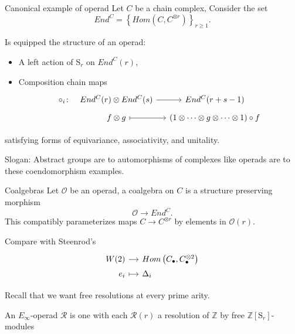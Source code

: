 \documentclass[10pt,t]{beamer}
\renewcommand{\S}{\mathrm{S}}
\begin{document}
\begin{frame}[fragile]{Canonical example of operad}
	Let $C$ be a chain complex, Consider the set
	\begin{equation*}
	End^C = \left\{Hom(C, C^{\otimes r})\right\}_{r \geq 1}.
	\end{equation*}
	
	\pause
	
	Is equipped the structure of an operad:
	\begin{itemize}
		\item A left action of $\S_r$ on $End^C(r)$,
		\item Composition chain maps
		\begin{equation*}
		\begin{tikzcd}[column sep=small, row sep=tiny]
		\circ_i \colon &[-10pt] End^C(r) \otimes End^C(s) \arrow[r] & End^C(r+s-1) \\
		& f \otimes g \arrow[r, |->] & (1 \otimes \cdots \otimes g \otimes \cdots \otimes 1) \circ f 
		\end{tikzcd}
		\end{equation*}
	\end{itemize}
	satisfying forms of equivariance, associativity, and unitality.
	
	\pause \vspace*{10pt}
	
	\textcolor{pblue}{Slogan:} Abstract groups are to automorphisms of complexes like operads are to these coendomorphism examples.
\end{frame}


\begin{frame}[fragile]{Coalgebras}
	Let $\mathcal O$ be an operad, a coalgebra on $C$ is a structure preserving morphism
	\begin{equation*}
	\mathcal O \to End^C.
	\end{equation*}
	This compatibly parameterizes maps $C \to C^{\otimes r}$ by elements in $\mathcal O(r)$.
	
	\pause \vspace*{10pt}
	
	Compare with Steenrod's
	\vspace*{-2pt}
	\begin{equation*}
	\begin{tikzcd}[%
	row sep=tiny,
	column sep = small,
	,row sep = 0ex
	,/tikz/column 1/.append style={anchor=base east}
	,/tikz/column 2/.append style={anchor=base west}
	]
	W(2) \arrow[r] & Hom\left(C_\bullet, C_\bullet^{\otimes 2}\right) \\
	e_i \arrow[r, |->] & \Delta_i
	\end{tikzcd}
	\end{equation*}
	
	\pause
	Recall that we want free resolutions at every prime arity.

	\pause

	\begin{definition}
		An $E_\infty$-operad $\mathcal R$ is one with each $\mathcal R(r)$ a resolution of $\mathbb Z$ by free $\mathbb Z[\S_r]$-modules
	\end{definition}
\end{frame}
\end{document}
